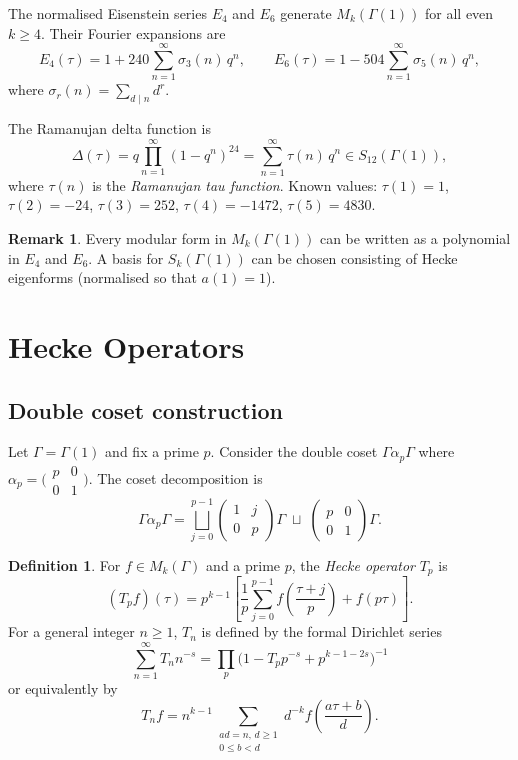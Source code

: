 \documentclass[12pt,a4paper]{amsart}
\theoremstyle{definition}
\newtheorem{definition}[theorem]{Definition}
\newtheorem{remark}[theorem]{Remark}
\begin{document}
The normalised Eisenstein series $E_4$ and $E_6$ generate $M_k(\Gamma(1))$
for all even $k \ge 4$. Their Fourier expansions are
\[
  E_4(\tau) = 1 + 240\sum_{n=1}^{\infty}\sigma_3(n)\,q^n, \qquad
  E_6(\tau) = 1 - 504\sum_{n=1}^{\infty}\sigma_5(n)\,q^n,
\]
where $\sigma_r(n) = \sum_{d \mid n} d^r$.

The Ramanujan delta function is
\[
  \Delta(\tau) = q\prod_{n=1}^{\infty}(1-q^n)^{24}
               = \sum_{n=1}^{\infty}\tau(n)\,q^n \in S_{12}(\Gamma(1)),
\]
where $\tau(n)$ is the \emph{Ramanujan tau function}. Known values:
$\tau(1)=1$, $\tau(2)=-24$, $\tau(3)=252$, $\tau(4)=-1472$, $\tau(5)=4830$.

\begin{remark}
  Every modular form in $M_k(\Gamma(1))$ can be written as a polynomial in
  $E_4$ and $E_6$. A basis for $S_k(\Gamma(1))$ can be chosen consisting of
  Hecke eigenforms (normalised so that $a(1)=1$).
\end{remark}

\section{Hecke Operators}

\subsection{Double coset construction}

Let $\Gamma = \Gamma(1)$ and fix a prime $p$. Consider the double coset
$\Gamma \alpha_p \Gamma$ where $\alpha_p = \bigl(\begin{smallmatrix}p&0\\0&1\end{smallmatrix}\bigr)$.
The coset decomposition is
\[
  \Gamma \alpha_p \Gamma = \bigsqcup_{j=0}^{p-1}
  \begin{pmatrix}1&j\\0&p\end{pmatrix}\Gamma
  \;\sqcup\;
  \begin{pmatrix}p&0\\0&1\end{pmatrix}\Gamma.
\]

\begin{definition}
  For $f \in M_k(\Gamma)$ and a prime $p$, the \emph{Hecke operator} $T_p$ is
  \[
    (T_p f)(\tau) = p^{k-1} \left[
      \frac{1}{p}\sum_{j=0}^{p-1} f\!\left(\frac{\tau+j}{p}\right)
      + f(p\tau)
    \right].
  \]
  For a general integer $n \ge 1$, $T_n$ is defined by the formal Dirichlet series
  \[
    \sum_{n=1}^{\infty} T_n n^{-s} =
    \prod_{p}\bigl(1 - T_p p^{-s} + p^{k-1-2s}\bigr)^{-1}
  \]
  or equivalently by
  \[
    T_n f = n^{k-1} \sum_{\substack{ad=n,\, d\ge 1 \\ 0 \le b < d}}
    d^{-k} f\!\left(\frac{a\tau+b}{d}\right).
  \]
\end{definition}
\end{document}
